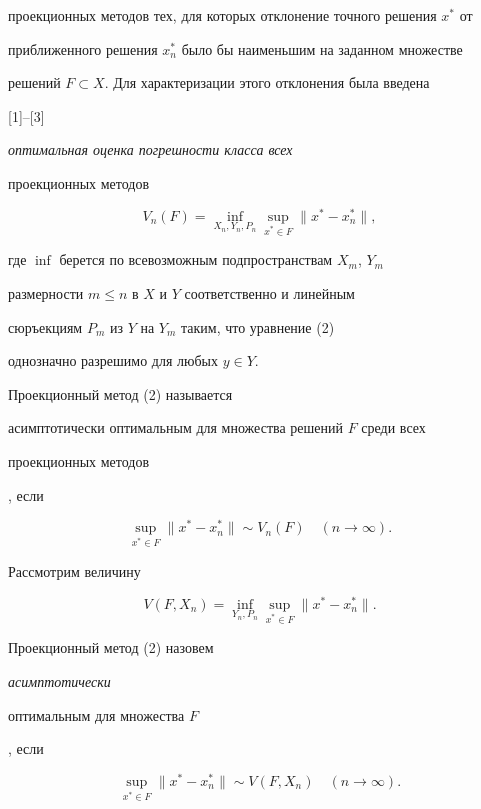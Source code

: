 проекционных методов тех, для которых отклонение точного решения $x^*$ от


приближенного решения $x_n^*$ было бы наименьшим на заданном множестве


решений $F \subset X$. Для характеризации этого отклонения была введена


[1]--[3] {\it оптимальная оценка погрешности класса всех


проекционных методов}


$$


V_n(F) = \inf_{X_n, Y_n, P_n} \sup_{x^*\in F} \|x^* - x_n^*\|,


$$


где \; $\inf$\; берется по всевозможным подпространствам $X_m$, $Y_m$


размерности $m \leq n$ в $X$ и $Y$ соответственно и линейным


сюръекциям $P_m$ из $Y$ на $Y_m$ таким, что уравнение (2)


однозначно разрешимо для любых $y\in Y$.





\begin{defn}


Проекционный метод (2) называется {\it


асимптотически оптимальным для множества решений $F$ среди всех


проекционных методов}, если


$$


\sup_{x^*\in F} \|x^* - x_n^*\| \sim V_n(F) \quad (n \rightarrow \infty).


$$


\end{defn}





Рассмотрим величину


$$


V(F,X_n) = \inf_{Y_n,P_n} \sup_{x^* \in F}\|x^* - x_n^*\|.


$$





\begin{defn}


Проекционный метод (2) назовем {\it асимптотически


оптимальным для множества $F$}, если


$$


\sup_{x^*\in F} \|x^* - x_n^*\| \sim V(F,X_n)\quad


(n \rightarrow \infty).


$$


\end{defn}





